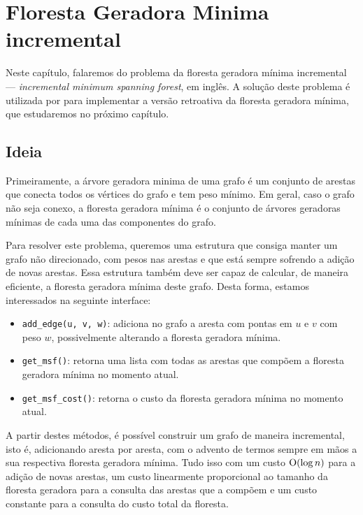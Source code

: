 
\chapter{Floresta Geradora Minima incremental}
\label{cap:incremental-msf}

Neste capítulo, falaremos do problema da floresta geradora mínima incremental --- \emph{incremental minimum spanning forest}, em inglês. A solução deste problema é utilizada por \citet{10.1093/comjnl/bxaa135} para implementar a versão retroativa da floresta geradora mínima, que estudaremos no próximo capítulo.

\section{Ideia}
\label{sec:imsf-ideia}

Primeiramente, a árvore geradora minima de uma grafo é um conjunto de arestas que conecta todos os vértices do grafo e tem peso mínimo. Em geral, caso o grafo não seja conexo, a floresta geradora mínima é o conjunto de árvores geradoras mínimas de cada uma das componentes do grafo.

Para resolver este problema, queremos uma estrutura que consiga manter um grafo não direcionado, com pesos nas arestas e que está sempre sofrendo a adição de novas arestas. Essa estrutura também deve ser capaz de calcular, de maneira eficiente, a floresta geradora mínima deste grafo. Desta forma, estamos interessados na seguinte interface:

\begin{itemize}
    \item \texttt{add\_edge(u, v, w)}: adiciona no grafo a aresta com pontas em $u$ e $v$ com peso $w$, possivelmente alterando a floresta geradora mínima.
    \item \texttt{get\_msf()}: retorna uma lista com todas as arestas que compõem a floresta geradora mínima no momento atual.
    \item \texttt{get\_msf\_cost()}: retorna o custo da floresta geradora mínima no momento atual.
\end{itemize}

A partir destes métodos, é possível construir um grafo de maneira incremental, isto é, adicionando aresta por aresta, com o advento de termos sempre em mãos a sua respectiva floresta geradora mínima. Tudo isso com um custo $\mathrm{O} (\log n)$ para a adição de novas arestas, um custo linearmente proporcional ao tamanho da floresta geradora para a consulta das arestas que a compõem e um custo constante para a consulta do custo total da floresta.

